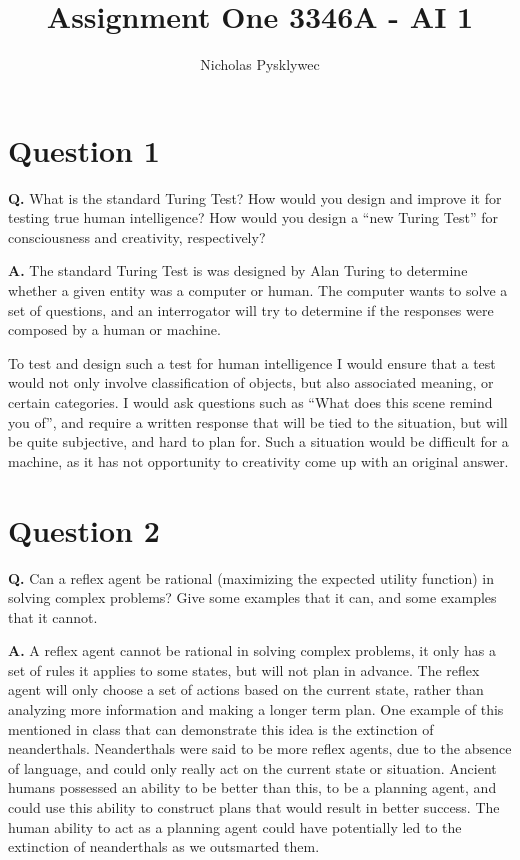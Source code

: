 \documentclass[12pt]{amsart}
\title{Assignment One 3346A - AI 1}
\author{Nicholas Pysklywec}
\begin{document}
\maketitle

\section*{Question 1 }
\textbf{Q.} What is the standard Turing Test? How would you design and improve it for testing true human intelligence? How would you design a “new Turing Test” for consciousness and creativity, respectively?    \hfill \break

\textbf{A.} The standard Turing Test is was designed by Alan Turing to determine whether a given entity was a computer or human. The computer wants to solve a set of questions, and an interrogator will try to determine if the responses were composed by a human or machine. 

To test and design such a test for human intelligence I would ensure that a test would not only involve classification of objects, but also associated meaning, or certain categories. I would ask questions such as “What does this scene remind you of”, and require a written response that will be tied to the situation, but will be quite subjective, and hard to plan for. Such a situation would be difficult for a machine, as it has not opportunity to creativity come up with an original answer. 
   \hfill \break

\section*{Question 2}
\textbf{Q.} Can a reflex agent be rational (maximizing the expected utility function) in solving complex problems? Give some examples that it can, and some examples that it cannot.     \hfill \break

\textbf{A.} A reflex agent cannot be rational in solving complex problems, it only has a set of rules it applies to some states, but will not plan in advance. The reflex agent will only choose a set of actions based on the current state, rather than analyzing more information and making a longer term plan. One example of this mentioned in class that can demonstrate this idea is the extinction of neanderthals. Neanderthals were said to be more reflex agents, due to the absence of language, and could only really act on the current state or situation. Ancient humans possessed an ability to be better than this, to be a planning agent, and could use this ability to construct plans that would result in better success. The human ability to act as a planning agent could have potentially led to the extinction of neanderthals as we outsmarted them.   \hfill \break
\end{document}
